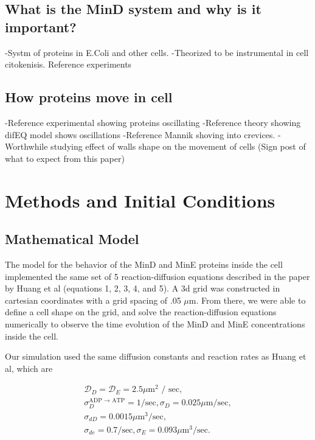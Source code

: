 \documentclass[letterpaper,twocolumn,amsmath,amssymb,pre]{revtex4-1}
\begin{document}
\subsection{What is the MinD system and why is it important?}


-Systm of proteins in E.Coli and other cells.
-Theorized to be instrumental in cell citokenisis. Reference experiments
\subsection{How proteins move in cell}
-Reference experimental showing proteins oscillating
-Reference theory showing difEQ model shows oscillations
-Reference Mannik shoving into crevices.
-Worthwhile studying effect of walls shape on the movement of cells
(Sign post of what to expect from this paper)

\section{Methods and Initial Conditions}
\subsection{Mathematical Model} %
The model for the behavior of the MinD and MinE proteins inside the cell
implemented the same set of 5 reaction-diffusion equations described in the paper
by Huang et al (equations 1, 2, 3, 4, and 5). A 3d grid was constructed in
cartesian coordinates with a grid spacing of .05 $\mu$m. From there, we
were able to define a cell shape on the grid, and solve the
reaction-diffusion equations numerically to observe the time evolution of
the MinD and MinE concentrations inside the cell.

Our simulation used the same diffusion constants and reaction rates as
Huang et al, which are

\begin{gather*} %
  \mathcal{D}_D = \mathcal{D}_{E}  = 2.5 \mu \textrm{m$^2$ / sec}, \\
  \sigma_D^{\textrm{ADP $\rightarrow$ ATP}}  = 1/\textrm{sec},  \sigma_D = 0.025 \mu \textrm{m/sec}, \\
  \sigma_{dD}  = 0.0015 \mu \textrm{m$^3$/sec}, \\
  \sigma_{de}  = 0.7/\textrm{sec}, \sigma_E = 0.093 \mu \textrm{m$^3$/sec}.
\end{gather*}
\end{document}
